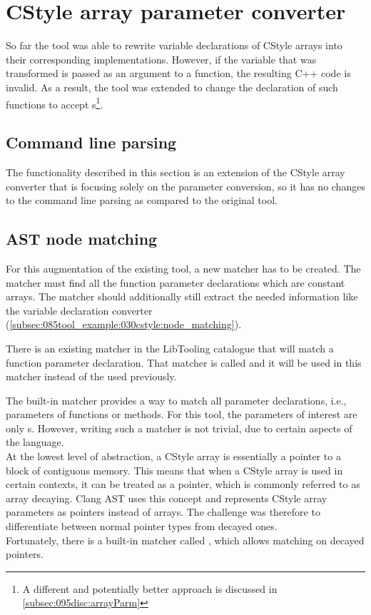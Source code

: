
\section{CStyle array parameter converter} \label{sec:080:035:cstyleArrayParm}

So far the tool was able to rewrite variable declarations of CStyle arrays into their corresponding  implementations. However, if the variable that was transformed is passed as an argument to a function, the resulting C++ code is invalid.
As a result, the tool was extended to change the declaration of such functions to accept s\footnote{
    A different and potentially better approach is discussed in \cref{subsec:095disc:arrayParm}
}.

\subsection{Command line parsing}

The functionality described in this section is an extension of the CStyle array converter that is focusing solely on the parameter conversion, so it has no changes to the command line parsing as compared to the original tool.

\subsection{AST node matching}

For this augmentation of the existing tool, a new matcher has to be created. The matcher must find all the function parameter declarations which are constant arrays. The matcher should additionally still extract the needed information like the variable declaration converter (\cref{subsec:085tool_example:030cstyle:node_matching}).

There is an existing matcher in the LibTooling catalogue that will match a function parameter declaration. That matcher is called  and it will be used in this matcher instead of the  used previously.

The built-in matcher  provides a way to match all parameter declarations, i.e., parameters of functions or methods. For this tool, the parameters of interest are only s. However, writing such a matcher is not trivial, due to certain aspects of the language.\\
At the lowest level of abstraction, a CStyle array is essentially a pointer to a block of contiguous memory.
This means that when a CStyle array is used in certain contexts, it can be treated as a pointer, which is commonly referred to as array decaying.
Clang AST uses this concept and represents CStyle array parameters as pointers instead of arrays.
The challenge was therefore to differentiate between normal pointer types from decayed ones.\\
Fortunately, there is a built-in matcher called , which allows matching on decayed pointers.

